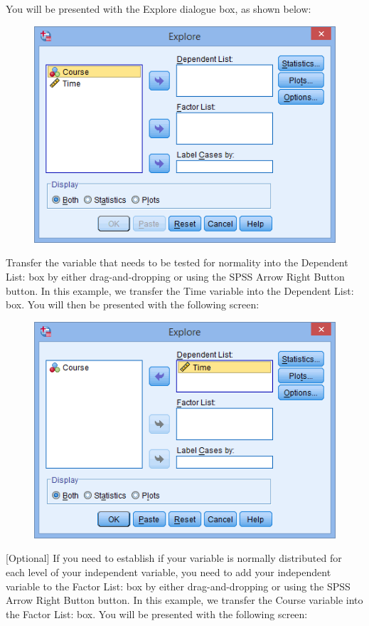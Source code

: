 \documentclass[]{article}
\begin{document}
You will be presented with the Explore dialogue box, as shown below:

\begin{figure}
	\centering
	\includegraphics[width=0.7\linewidth]{Normality/normality-2}
	\caption{}
	\label{fig:normality-2}
\end{figure}
Transfer the variable that needs to be tested for normality into the Dependent List: box by either drag-and-dropping or using the SPSS Arrow Right Button button. In this example, we transfer the Time variable into the Dependent List: box. You will then be presented with the following screen:

\begin{figure}
	\centering
	\includegraphics[width=0.7\linewidth]{Normality/normality-3}
	\caption{}
	\label{fig:normality-3}
\end{figure}
[Optional] If you need to establish if your variable is normally distributed for each level of your independent variable, you need to add your independent variable to the Factor List: box by either drag-and-dropping or using the SPSS Arrow Right Button button. In this example, we transfer the Course variable into the Factor List: box. You will be presented with the following screen:
\end{document}
